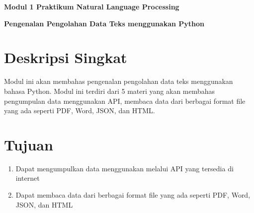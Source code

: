 \documentclass{article}
\begin{document}
    \begin{center}
        \textbf{Modul 1 Praktikum Natural Language Processing}

        \textbf{Pengenalan Pengolahan Data Teks menggunakan Python}
    \end{center}

    \section*{Deskripsi Singkat}
    Modul ini akan membahas pengenalan pengolahan data teks menggunakan bahasa Python. Modul ini terdiri dari 5 materi yang akan membahas pengumpulan data menggunakan API, membaca data dari berbagai format file yang ada seperti PDF, Word, JSON, dan HTML.

    \section*{Tujuan}
    \begin{enumerate}
        \item Dapat mengumpulkan data menggunakan melalui API yang tersedia di internet
        \item Dapat membaca data dari berbagai format file yang ada seperti PDF, Word, JSON, dan HTML
    \end{enumerate}
\end{document}

